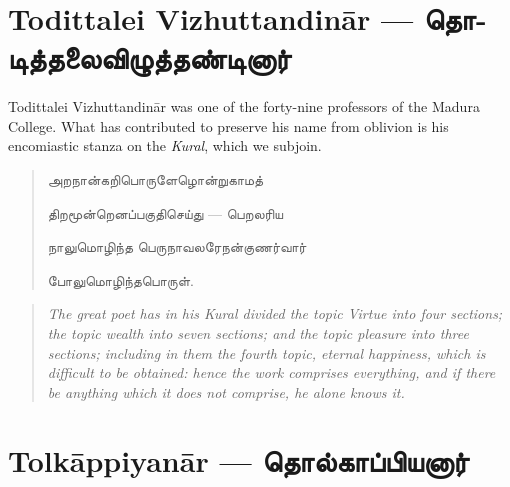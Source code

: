 \documentclass{article}
\newcommand{\TamilText}[1]{\texttamil{#1}}
\newcommand{\TamilBold}[1]{\texttamil{\textbf{#1}}}
\newcommand{\tam}[1]{\TamilText{#1}}
\newcommand{\tambold}[1]{\TamilBold{#1}}
\begin{document}
\section{Todittalei Vizhuttandin\={a}r --- \tambold{தொடித்தலைவிழுத்தண்டினார்}}
\paragraph{}
Todittalei Vizhuttandin\={a}r was one of the forty-nine professors of the Madura College. What has contributed to preserve his name from oblivion is his encomiastic stanza on the \emph{Kural}, which we subjoin.
\begin{quotation}\small
\tam{அறநான்கறிபொருளேழொன்றுகாமத்‌}

\tam{திறமூன்றெனப்பகுதிசெய்து} --- \tam{பெறலரிய}

\tam{நாலுமொழிந்த பெருநாவலரேநன்குணர்வார்}

\tam{போலுமொழிந்தபொருள்‌}.
\end{quotation}
\begin{quotation}\small
\emph{The great poet has in his Kural divided the topic Virtue into four sections; the topic wealth into seven sections; and the topic pleasure into three sections; including in them the fourth topic, eternal happiness, which is difficult to be obtained: hence the work comprises everything, and if there be anything which it does not comprise, he alone knows it.}
\end{quotation}

\section{Tolk\={a}ppiyan\={a}r --- \tambold{தொல்காப்பியனார்}}
\end{document}

